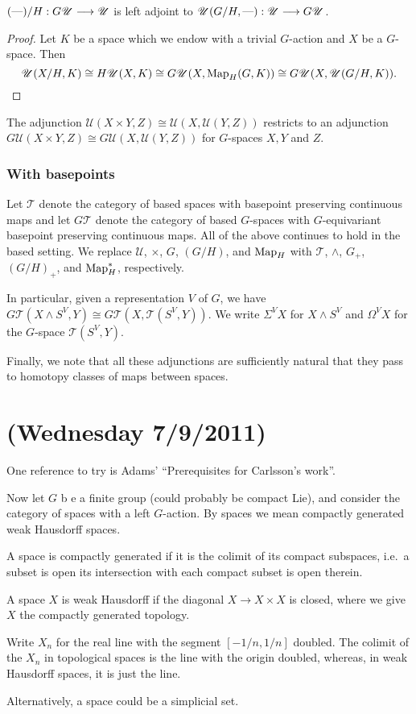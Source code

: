 \documentclass[11pt]{article}
\newcommand{\NewLecture}[3]{\section{#1 {\small(#2/#3/2011)}}}
\begin{document}
\begin{thm*}
$(\textup{---})/H:G\mathscr{U}\longrightarrow\mathscr{U}$ is left adjoint to $\mathscr{U}(G/H,\textup{---}):\mathscr{U}\longrightarrow G\mathscr{U}$.
\end{thm*}
\begin{proof}
Let $K$ be a space which we endow with a trivial $G$-action and $X$ be a $G$-space. Then
\[\mathscr{U}(X/H,K)\cong H\mathscr{U}(X,K)\cong G\mathscr{U}(X,\textup{Map}_H(G,K))\cong G\mathscr{U}(X,\mathscr{U}(G/H,K)).\qedhere\]
\end{proof}
\begin{thm*}
The adjunction $\mathscr{U}(X\times Y,Z)\cong\mathscr{U}(X,\mathscr{U}(Y,Z))$ restricts to an adjunction $G\mathscr{U}(X\times Y,Z)\cong G\mathscr{U}(X,\mathscr{U}(Y,Z))$ for $G$-spaces $X,Y$ and $Z$.
\end{thm*}
\subsubsection*{With basepoints}
Let $\mathscr{T}$ denote the category of based spaces with basepoint preserving continuous maps and let $G\mathscr{T}$ denote the category of based $G$-spaces with $G$-equivariant basepoint preserving continuous maps.
All of the above continues to hold in the based setting. We replace $\mathscr{U}$, $\times$, $G$, $(G/H)$, and $\textup{Map}_H$ with $\mathscr{T}$, $\wedge$, $G_+$, $(G/H)_+$, and $\textup{Map}^*_H$, respectively.

In particular, given a representation $V$ of $G$, we have
$G\mathscr{T}(X\wedge S^V, Y)\cong G\mathscr{T}(X,\mathscr{T}(S^V,Y))$. We write $\Sigma^V X$ for $X\wedge S^V$ and $\Omega^V X$ for the $G$-space $\mathscr{T}(S^V,Y)$.

Finally, we note that all these adjunctions are sufficiently natural that they pass to homotopy classes of maps between spaces.


\NewLecture{}{Wednesday 7}{9}
One reference to try is Adams' ``Prerequisites for Carlsson's work''.

Now let $G$ b e a finite group (could probably be compact Lie), and consider the category of spaces with a left $G$-action. By spaces we mean compactly generated weak Hausdorff spaces.
\begin{itemise}
\item A space is compactly generated if it is the colimit of its compact subspaces, i.e.\ a subset is open \Iff its intersection with each compact subset is open therein.
\item A space $X$ is weak Hausdorff if the diagonal $X\to X\times X$ is closed, where we give $X$ the compactly generated topology.
\item Write $X_n$ for the real line with the segment $[-1/n,1/n]$ doubled. The colimit of the $X_n$ in topological spaces is the line with the origin doubled, whereas, in weak Hausdorff spaces, it is just the line.
\end{itemise}
Alternatively, a space could be a simplicial set.
\end{document}
